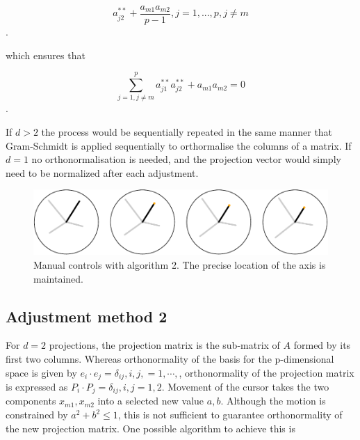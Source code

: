 \documentclass[]{interact}
\theoremstyle{plain}%
\theoremstyle{definition}
\theoremstyle{remark}
\begin{document}
\[a^{**}_{j2}+\frac{a_{m1}a_{m2}}{p-1}, j=1, ..., p, j\neq m\].

which ensures that

\[\sum_{j=1, j\neq m}^p a^{**}_{j1}a^{**}_{j2} + a_{m1}a_{m2} = 0\].

If \(d>2\) the process would be sequentially repeated in the same manner
that Gram-Schmidt is applied sequentially to orthormalise the columns of
a matrix. If \(d=1\) no orthonormalisation is needed, and the projection
vector would simply need to be normalized after each adjustment.

\begin{figure}
\includegraphics[width=1\linewidth]{appendix_files/figure-latex/othermethod-1} \caption{Manual controls with algorithm 2. The precise location of the axis is maintained.}\label{fig:othermethod}
\end{figure}

\hypertarget{adjustment-method-2}{%
\subsection{Adjustment method 2}\label{adjustment-method-2}}

For \(d=2\) projections, the projection matrix is the sub-matrix of
\(A\) formed by its first two columns. Whereas orthonormality of the
basis for the p-dimensional space is given by
\(e_i\cdot e_j=\delta_{ij},{i,j,=1,\cdots,}\), orthonormality of the
projection matrix is expressed as
\(P_i\cdot P_j=\delta_{ij}, {i,j=1,2}\). Movement of the cursor takes
the two components \({x_{m1},x_{m2}}\) into a selected new value
\({a,b}\). Although the motion is constrained by \(a^2+b^2\leq 1\), this
is not sufficient to guarantee orthonormality of the new projection
matrix. One possible algorithm to achieve this is
\end{document}
